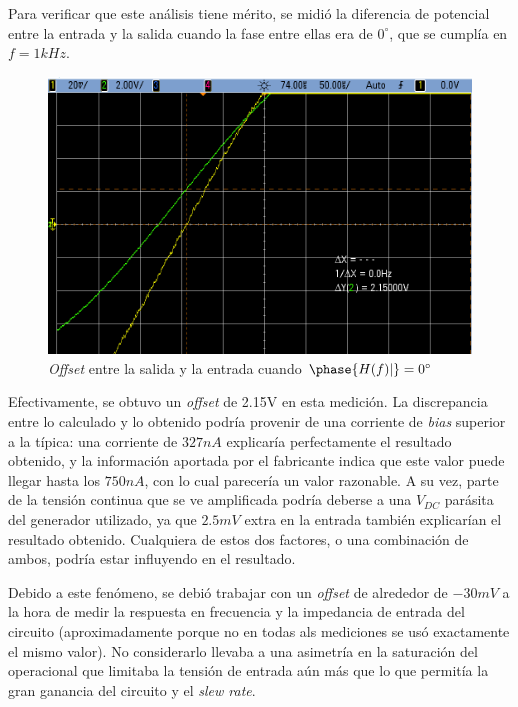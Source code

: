 \documentclass[../../main.tex]{subfiles}
\begin{document}
Para  verificar que este an\'alisis tiene m\'erito, se midi\'o la diferencia de potencial entre la entrada y la salida cuando la fase entre ellas era de $0^\circ$, que se cumpl\'ia en $f=1kHz$.

\begin{figure}[htb]
	\centering
	\includegraphics[scale=0.5]{fotos/tc_tp2_ej2_offset.png}
	\caption{\textit{Offset} entre la salida y la entrada cuando $\phase{H(f)|}=0^\circ$}
\end{figure}

Efectivamente, se obtuvo un \textit{offset} de 2.15V en esta medici\'on. La discrepancia entre lo calculado y lo obtenido podr\'ia provenir de una corriente de \textit{bias} superior a la t\'ipica: una corriente de $327nA$ explicar\'ia perfectamente el resultado obtenido, y la informaci\'on aportada por el fabricante indica que este valor puede llegar hasta los $750nA$, con lo cual parecer\'ia un valor razonable. A su vez, parte de la tensi\'on continua que se ve amplificada podr\'ia deberse a una $V_{DC}$ par\'asita del generador utilizado, ya que $2.5mV$ extra en la entrada tambi\'en explicar\'ian el resultado obtenido. Cualquiera de estos dos factores, o una combinaci\'on de ambos, podr\'ia estar influyendo en el resultado.\par

Debido a este fen\'omeno, se debi\'o trabajar con un \textit{offset} de alrededor de $-30mV$ a la hora de medir la respuesta en frecuencia y la impedancia de entrada del circuito (aproximadamente porque no en todas als mediciones se us\'o exactamente el mismo valor). No considerarlo llevaba a una asimetr\'ia en la saturaci\'on del operacional que limitaba la tensi\'on de entrada a\'un m\'as que lo que permit\'ia la gran ganancia del circuito y el \textit{slew rate}. \par
\end{document}
